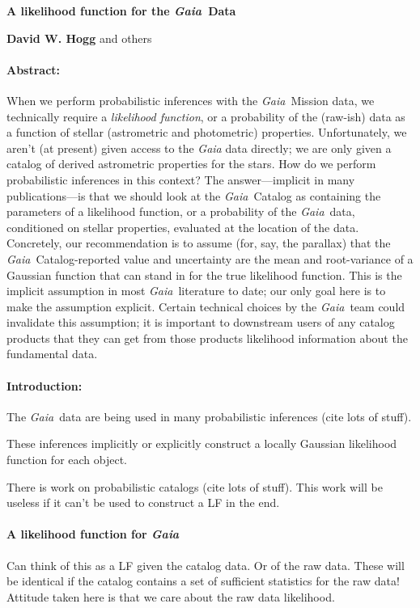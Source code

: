 \documentclass[12pt]{article}
\newcommand{\Gaia}{\textsl{Gaia}}
\begin{document}
\noindent
\textbf{A likelihood function for the \Gaia\ Data}
\bigskip

\noindent
\textbf{David W. Hogg} and others

\paragraph{Abstract:}
When we perform probabilistic inferences with the \Gaia\ Mission data,
we technically require
a \emph{likelihood function}, or a probability of the (raw-ish) data as a function
of stellar (astrometric and photometric) properties.
Unfortunately, we aren't (at present) given access to the \Gaia
data directly;
we are only given a catalog of derived astrometric properties for the stars.
How do we perform probabilistic inferences in this context?
The answer---implicit in many publications---is that we should look at the
\Gaia\ Catalog as containing the parameters of a likelihood function, or
a probability of the \Gaia\ data, conditioned on stellar properties,
evaluated at the location of the data.
Concretely, our recommendation is to assume
(for, say, the parallax) that the \Gaia\ Catalog-reported
value and uncertainty are the mean and root-variance of a Gaussian
function that can stand in for the true likelihood function.
This is the implicit assumption in most \Gaia\ literature to date;
our only goal here is to make the assumption explicit.
Certain technical choices by the \Gaia\ team could invalidate
this assumption; it is important to downstream users of any catalog products
that they can get from those products likelihood information about the fundamental
data.

\paragraph{Introduction:}
The \Gaia\ data are being used in many probabilistic inferences (cite lots of stuff).

These inferences implicitly or explicitly construct a locally Gaussian
likelihood function for each object.

There is work on probabilistic catalogs (cite lots of stuff). This work
will be useless if it can't be used to construct a LF in the end.

\paragraph{A likelihood function for \Gaia}
Can think of this as a LF given the catalog data. Or of the raw data.
These will be identical if the catalog contains a set of sufficient statistics
for the raw data!
Attitude taken here is that we care about the raw data likelihood.
\end{document}
